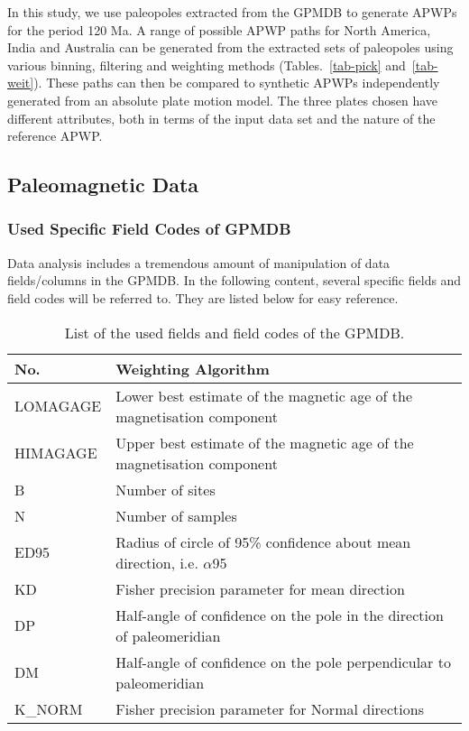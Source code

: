 In this study, we use paleopoles extracted from the GPMDB to generate APWPs for
the period 120 Ma. A range of possible APWP paths for North America,
India and Australia can be generated from the extracted sets of paleopoles using
various binning, filtering and weighting methods (Tables.~\ref{tab-pick}
and~\ref{tab-weit}). These paths can then be compared to synthetic APWPs
independently generated from an absolute plate motion model. The three plates
chosen have different attributes, both in terms of the input data set and the
nature of the reference APWP.

\subsection{Paleomagnetic Data}

\subsubsection{Used Specific Field Codes of GPMDB}

Data analysis includes a tremendous amount of manipulation of data
fields/columns in the GPMDB\@. In the following content, several specific fields
and field codes will be referred to. They are listed below for easy reference.

\begin{table}
\centering
\caption{List of the used fields and field codes of the GPMDB.}\label{tab-fld}
\begin{tabular}{@{}ll@{}}
\toprule
No. & Weighting Algorithm \\ \midrule
LOMAGAGE & Lower best estimate of the magnetic age of the magnetisation component \\
HIMAGAGE & Upper best estimate of the magnetic age of the magnetisation component \\
B & Number of sites \\
N & Number of samples \\
ED95 & Radius of circle of 95\% confidence about mean direction, i.e. $\alpha$95 \\
KD & Fisher precision parameter for mean direction \\
DP & Half-angle of confidence on the pole in the direction of paleomeridian \\
DM & Half-angle of confidence on the pole perpendicular to paleomeridian \\
K\_NORM & Fisher precision parameter for Normal directions \\
  \bottomrule
\end{tabular}
\end{table}

